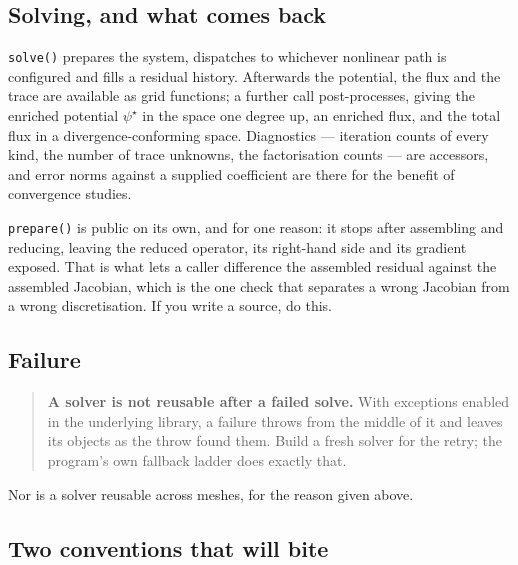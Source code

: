 \subsection{Solving, and what comes back}

\texttt{solve()} prepares the system, dispatches to whichever nonlinear path is
configured and fills a residual history. Afterwards the potential, the flux and
the trace are available as grid functions; a further call post-processes, giving
the enriched potential $\psi^{\star}$ in the space one degree up, an enriched
flux, and the total flux in a divergence-conforming space. Diagnostics ---
iteration counts of every kind, the number of trace unknowns, the factorisation
counts --- are accessors, and error norms against a supplied coefficient are
there for the benefit of convergence studies.

\texttt{prepare()} is public on its own, and for one reason: it stops after
assembling and reducing, leaving the reduced operator, its right-hand side and
its gradient exposed. That is what lets a caller difference the assembled
residual against the assembled Jacobian, which is the one check that separates a
wrong Jacobian from a wrong discretisation. If you write a source, do this.

\subsection{Failure}

\begin{quote}
	\textbf{A solver is not reusable after a failed solve.} With exceptions
	enabled in the underlying library, a failure throws from the middle of it and
	leaves its objects as the throw found them. Build a fresh solver for the
	retry; the program's own fallback ladder does exactly that.
\end{quote}

Nor is a solver reusable across meshes, for the reason given above.

\subsection{Two conventions that will bite}

